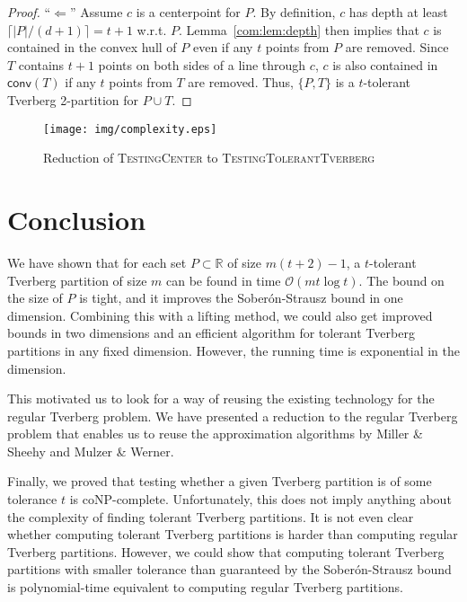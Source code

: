 \documentclass[oribibl,envcountsame,envcountsect]{llncs}
\newcommand{\bo}[1]{\mathcal{O}(#1)}
\newcommand{\conv}{\mathsf{conv}}
\newcommand{\real}{\mathbb{R}}
\newcommand{\Soberon}{Sober\'{o}n}
\begin{document}
\begin{proof}
  ``$\Leftarrow$'' Assume $c$ is a centerpoint for $P$. By
      definition, $c$ has depth at least
      $\lceil|P|/(d+1)\rceil = t+1$ w.r.t. $P$. Lemma~\ref{com:lem:depth}
      then implies that $c$ is contained in the
      convex hull of $P$ even if any $t$ points from $P$ are removed. Since
      $T$ contains $t+1$ points on both sides of a line through $c$, $c$ is also
      contained in $\conv(T)$ if any $t$ points from $T$ are removed.
      Thus,
      $\{P, T\}$ is a $t$-tolerant Tverberg 2-partition for $P\cup T$.
\end{proof}
\begin{figure}[htbp]
  \begin{center}
    \texttt{[image: img/complexity.eps]}
  \end{center}
  \caption{Reduction of \textsc{TestingCenter} to
    \textsc{TestingTolerantTverberg}}
  \label{com:fig:red}
\end{figure}


\section{Conclusion}
We have shown that for each set $P\subset\real$ of size $m(t+2)-1$, a
$t$-tolerant Tverberg partition of size $m$ can be found in time
$\bo{mt\log t}$. The bound on the size of $P$ is tight, and it improves
the \Soberon{}-Strausz bound in one dimension.
Combining this with a lifting method, we could also get improved bounds in
two dimensions and an efficient algorithm for tolerant Tverberg partitions in
any fixed dimension.
However, the running time is exponential in the dimension.

This motivated us to look for a way of reusing the existing technology for
the regular Tverberg problem.
We have presented a reduction to the regular Tverberg problem
that enables us to
reuse the approximation algorithms by Miller \& Sheehy and Mulzer \& Werner.

Finally, we proved that testing whether a given Tverberg partition is of
some tolerance $t$ is coNP-complete.
Unfortunately, this does not imply anything about the complexity of
finding tolerant Tverberg partitions. It is not even clear
whether computing tolerant Tverberg partitions is harder than computing
regular Tverberg partitions. However, we could show that computing tolerant
Tverberg partitions with smaller tolerance than guaranteed by the
\Soberon{}-Strausz bound is polynomial-time equivalent to computing regular
Tverberg partitions.
\end{document}
